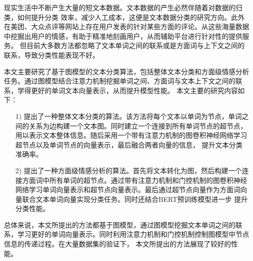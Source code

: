 	
\begin{chineseabstract}
现实生活中不断产生大量的短文本数据。文本数据的产生必然伴随着对数据的归类，如何提升分类
效率，减少人工成本，这便是文本数据分类的研究方向。此外在美团、大众点评等网站上存在用户发表的针对某些方面的评论。从这些海量数据中挖掘出用户的情感，有助于精准地刻画用户，从而辅助平台进行针对性的提供服务。
但目前大多数方法都忽略了文本单词之间的联系或是方面词与上下文之间的联系，导致分类性能表现不好。

本文主要研究了基于图模型的文本分类算法，包括整体文本分类和方面级情感分析任务。通过图模型结合注意力机制挖掘单词之间、方面词与文本上下文之间的联系，学得更好的单词文本向量表示，从而提升模型性能。
本文主要的研究内容如下：

\begin{itemize}
    \item [1)] 
    提出了一种整体文本分类的算法。该方法将每个文本以单词为节点，单词之间的关系为边构建一个文本图。同时建立一个连接到所有单词节点的超节点，用以表示文本整体信息。随后采用一个带有注意力机制的图卷积神经网络学习超节点以及单词节点的向量表示，最后融合两者向量的信息，
    提升文本分类准确率。
    \item [2)] 
    提出了一种方面级情感分析的算法。首先将文本转化为图，然后构建一个连接方面词中所有单词的超节点。通过带有注意力机制和门控机制的图卷积神经网络学习单词向量表示和超节点向量表示。最后通过超节点向量作为方面词向量联合文本单词向量实现分类任务。同时还结合BERT预训练模型进一步
    提升分类性能。
\end{itemize}

总体来说，本文所提出的方法都基于图模型，通过图模型挖掘文本单词之间的联系，学习更好的单词向量表示。同时利用注意力机制和门控机制控制图模型中节点信息的传递过程。在大量数据集的验证下，
本文所提出的方法展现了较好的性能。

\end{chineseabstract}

